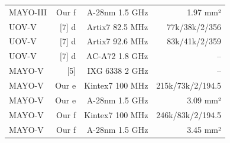 \begin{longtable}{lrrr}
{MAYO-III} & {Our f} & {A-28nm 1.5 GHz} & {1.97 mm²} \\
{UOV-V} & {[7] d} & {Artix7 82.5 MHz} & {77k/38k/2/356} \\
{UOV-V} & {[7] d} & {Artix7 92.6 MHz} & {83k/41k/2/359} \\
{UOV-V} & {[7] d} & {AC-A72 1.8 GHz} & {--} \\
{MAYO-V} & {[5]} & {IXG 6338 2 GHz} & {--} \\
{MAYO-V} & {Our e} & {Kintex7 100 MHz} & {215k/73k/2/194.5} \\
{MAYO-V} & {Our e} & {A-28nm 1.5 GHz} & {3.09 mm²} \\
{MAYO-V} & {Our f} & {Kintex7 100 MHz} & {246k/83k/2/194.5} \\
{MAYO-V} & {Our f} & {A-28nm 1.5 GHz} & {3.45 mm²} \\
\end{longtable}
\endgroup
\begingroup
\small
\setlength{\tabcolsep}{3pt}
\setlength{\LTcapwidth}{\textwidth}
